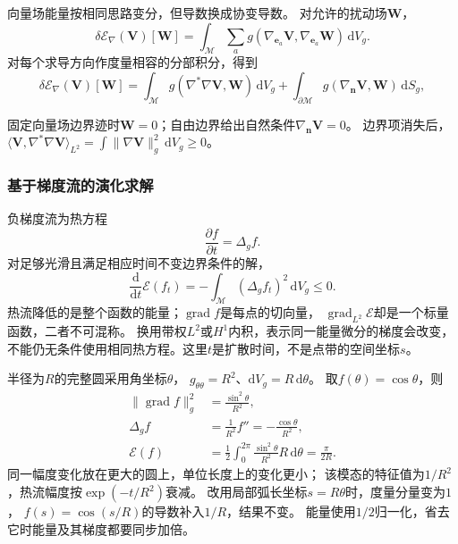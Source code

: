 向量场能量按相同思路变分，但导数换成协变导数。
对允许的扰动场$\bm W$，
\[
 \delta\mathcal E_\nabla(\bm V)[\bm W]
 =\int_{\mathcal M}\sum_a
     g(\nabla_{\bm e_a}\bm V,\nabla_{\bm e_a}\bm W)\,\mathrm dV_g.
\]
对每个求导方向作度量相容的分部积分，得到
\begin{equation}
 \delta\mathcal E_\nabla(\bm V)[\bm W]
 =\int_{\mathcal M}g(\nabla^*\nabla\bm V,\bm W)\,\mathrm dV_g
  +\int_{\partial\mathcal M}g(\nabla_{\bm n}\bm V,\bm W)\,\mathrm dS_g,
 \label{eq:geometry-connection-laplacian-variation}
\end{equation}


固定向量场边界迹时$\bm W=0$；自由边界给出自然条件$\nabla_{\bm n}\bm V=0$。
边界项消失后，
$\langle\bm V,\nabla^*\nabla\bm V\rangle_{L^2}
=\int\lVert\nabla\bm V\rVert_g^2\,\mathrm dV_g\geq0$。

\subsubsection{基于梯度流的演化求解}
\label{sec:functional-gradient-flow-solvers}

负梯度流为热方程
\begin{equation}
 \frac{\partial f}{\partial t}=\Delta_gf.
 \label{eq:geometry-heat-equation}
\end{equation}
对足够光滑且满足相应时间不变边界条件的解，
\[
 \frac{\mathrm d}{\mathrm dt}\mathcal E(f_t)
 =-\int_{\mathcal M}(\Delta_gf_t)^2\,\mathrm dV_g\leq0.
\]
热流降低的是整个函数的能量；$\operatorname{grad}f$是每点的切向量，
$\operatorname{grad}_{L^2}\mathcal E$却是一个标量函数，二者不可混称。
换用带权$L^2$或$H^1$内积，表示同一能量微分的梯度会改变，
不能仍无条件使用相同热方程。这里$t$是扩散时间，不是点带的空间坐标$s$。


\begin{example}
\label{ex:geometry-circle-energy-scale}
半径为$R$的完整圆采用角坐标$\theta$，
$g_{\theta\theta}=R^2$、$\mathrm dV_g=R\,\mathrm d\theta$。
取$f(\theta)=\cos\theta$，则
\[
 \begin{aligned}
 \lVert\operatorname{grad}f\rVert_g^2&=\frac{\sin^2\theta}{R^2},\\
 \Delta_gf&=\frac1{R^2}f''=-\frac{\cos\theta}{R^2},\\
 \mathcal E(f)&=\frac12\int_0^{2\pi}
        \frac{\sin^2\theta}{R^2}R\,\mathrm d\theta=\frac{\pi}{2R}.
 \end{aligned}
\]
同一幅度变化放在更大的圆上，单位长度上的变化更小；
该模态的特征值为$1/R^2$，热流幅度按$\exp(-t/R^2)$衰减。
改用局部弧长坐标$s=R\theta$时，度量分量变为$1$，
$f(s)=\cos(s/R)$的导数补入$1/R$，结果不变。
能量使用$1/2$归一化，省去它时能量及其梯度都要同步加倍。
\end{example}


